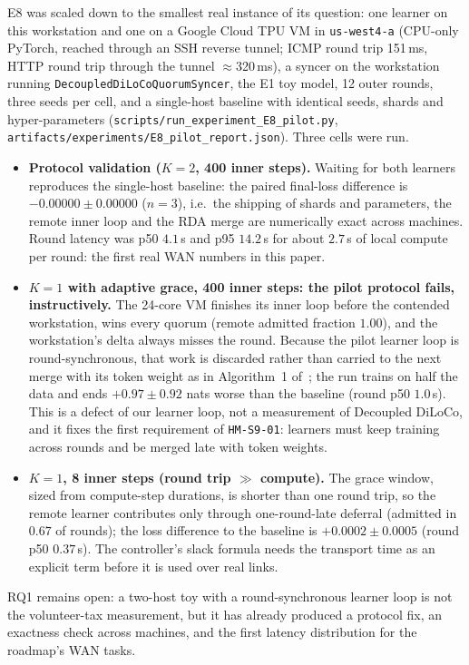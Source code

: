\documentclass[11pt,a4paper]{article}
\begin{document}
E8 was scaled down to the smallest real instance of its question: one learner on this workstation and one on a Google Cloud TPU VM in \texttt{us-west4-a} (CPU-only PyTorch, reached through an SSH reverse tunnel; ICMP round trip 151\,ms, HTTP round trip through the tunnel $\approx$320\,ms), a syncer on the workstation running \texttt{DecoupledDiLoCoQuorumSyncer}, the E1 toy model, 12 outer rounds, three seeds per cell, and a single-host baseline with identical seeds, shards and hyper-parameters (\texttt{scripts/run\_experiment\_E8\_pilot.py}, \texttt{artifacts/experiments/E8\_pilot\_report.json}). Three cells were run.
\begin{itemize}[leftmargin=1.8em]
    \item \textbf{Protocol validation ($K=2$, 400 inner steps).} Waiting for both learners reproduces the single-host baseline: the paired final-loss difference is $-0.00000 \pm 0.00000$ ($n=3$), i.e.\ the shipping of shards and parameters, the remote inner loop and the RDA merge are numerically exact across machines. Round latency was p50 $4.1$\,s and p95 $14.2$\,s for about $2.7$\,s of local compute per round: the first real WAN numbers in this paper.
    \item \textbf{$K=1$ with adaptive grace, 400 inner steps: the pilot protocol fails, instructively.} The 24-core VM finishes its inner loop before the contended workstation, wins every quorum (remote admitted fraction $1.00$), and the workstation's delta always misses the round. Because the pilot learner loop is round-synchronous, that work is discarded rather than carried to the next merge with its token weight as in Algorithm~1 of~\cite{douillard2026decoupled}; the run trains on half the data and ends $+0.97 \pm 0.92$ nats worse than the baseline (round p50 $1.0$\,s). This is a defect of our learner loop, not a measurement of Decoupled DiLoCo, and it fixes the first requirement of \texttt{HM-S9-01}: learners must keep training across rounds and be merged late with token weights.
    \item \textbf{$K=1$, 8 inner steps (round trip $\gg$ compute).} The grace window, sized from compute-step durations, is shorter than one round trip, so the remote learner contributes only through one-round-late deferral (admitted in $0.67$ of rounds); the loss difference to the baseline is $+0.0002 \pm 0.0005$ (round p50 $0.37$\,s). The controller's slack formula needs the transport time as an explicit term before it is used over real links.
\end{itemize}
RQ1 remains open: a two-host toy with a round-synchronous learner loop is not the volunteer-tax measurement, but it has already produced a protocol fix, an exactness check across machines, and the first latency distribution for the roadmap's WAN tasks.
\end{document}
